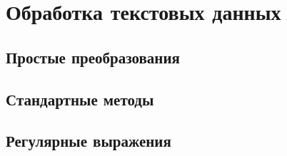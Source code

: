 \section{Обработка текстовых данных}

\subsection{Простые преобразования}

\subsection{Стандартные методы}

\subsection{Регулярные выражения}
